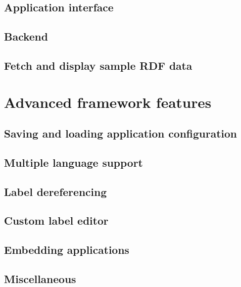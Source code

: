 \subsection{Application interface}

\subsection{Backend}

\subsection{Fetch and display sample RDF data}



\section{Advanced framework features}

\subsection{Saving and loading application configuration}

\subsection{Multiple language support}

\subsection{Label dereferencing}

\subsection{Custom label editor}

\subsection{Embedding applications}

\subsection{Miscellaneous}
